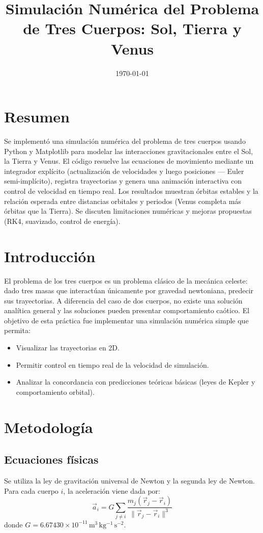 \documentclass[12pt,a4paper]{article}
\title{Simulación Numérica del Problema de Tres Cuerpos: Sol, Tierra y Venus}
\author{}
\date{\today}
\begin{document}
\maketitle

\section*{Resumen}
Se implementó una simulación numérica del problema de tres cuerpos usando Python y Matplotlib para modelar las interacciones gravitacionales entre el Sol, la Tierra y Venus. El código resuelve las ecuaciones de movimiento mediante un integrador explícito (actualización de velocidades y luego posiciones — Euler semi-implícito), registra trayectorias y genera una animación interactiva con control de velocidad en tiempo real. Los resultados muestran órbitas estables y la relación esperada entre distancias orbitales y periodos (Venus completa más órbitas que la Tierra). Se discuten limitaciones numéricas y mejoras propuestas (RK4, suavizado, control de energía).

\section{Introducción}
El problema de los tres cuerpos es un problema clásico de la mecánica celeste: dado tres masas que interactúan únicamente por gravedad newtoniana, predecir sus trayectorias. A diferencia del caso de dos cuerpos, no existe una solución analítica general y las soluciones pueden presentar comportamiento caótico. El objetivo de esta práctica fue implementar una simulación numérica simple que permita:
\begin{itemize}
    \item Visualizar las trayectorias en 2D.
    \item Permitir control en tiempo real de la velocidad de simulación.
    \item Analizar la concordancia con predicciones teóricas básicas (leyes de Kepler y comportamiento orbital).
\end{itemize}

\section{Metodología}
\subsection{Ecuaciones físicas}
Se utiliza la ley de gravitación universal de Newton y la segunda ley de Newton. Para cada cuerpo $i$, la aceleración viene dada por:
\begin{equation}
    \vec{a}_i = G \sum_{j \neq i} \frac{m_j (\vec{r}_j - \vec{r}_i)}{\|\vec{r}_j - \vec{r}_i\|^3}
\end{equation}
donde $G = 6.67430 \times 10^{-11} \, \mathrm{m^3\,kg^{-1}\,s^{-2}}$.
\end{document}
